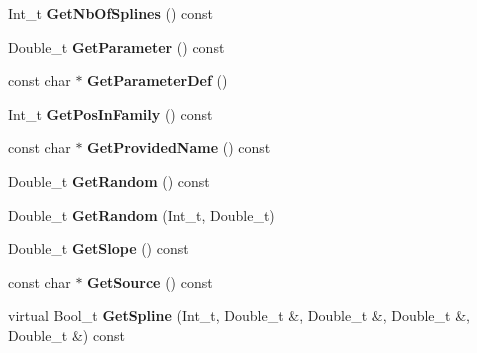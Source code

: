 \begin{DoxyCompactItemize}
\item 
\hypertarget{classTSplineFit_a4f965fd2a14a1d60c898f4e51492aaed}{
Int\_\-t {\bfseries GetNbOfSplines} () const }
\label{classTSplineFit_a4f965fd2a14a1d60c898f4e51492aaed}

\item 
\hypertarget{classTSplineFit_ad75b42637186a1c32ca4c2fd1013ff97}{
Double\_\-t {\bfseries GetParameter} () const }
\label{classTSplineFit_ad75b42637186a1c32ca4c2fd1013ff97}

\item 
\hypertarget{classTSplineFit_a7ba8494513323c4d212e649c0e2cddc5}{
const char $\ast$ {\bfseries GetParameterDef} ()}
\label{classTSplineFit_a7ba8494513323c4d212e649c0e2cddc5}

\item 
\hypertarget{classTSplineFit_aef905799c6e58fd587476a6e225b253a}{
Int\_\-t {\bfseries GetPosInFamily} () const }
\label{classTSplineFit_aef905799c6e58fd587476a6e225b253a}

\item 
\hypertarget{classTSplineFit_a3b7036bfb75e585cd00928e6ad63d305}{
const char $\ast$ {\bfseries GetProvidedName} () const }
\label{classTSplineFit_a3b7036bfb75e585cd00928e6ad63d305}

\item 
\hypertarget{classTSplineFit_a0a2b04890810a740dc8899b1d9a5b47e}{
Double\_\-t {\bfseries GetRandom} () const }
\label{classTSplineFit_a0a2b04890810a740dc8899b1d9a5b47e}

\item 
\hypertarget{classTSplineFit_a4f6786e9b1624c085ff443eef3fdc282}{
Double\_\-t {\bfseries GetRandom} (Int\_\-t, Double\_\-t)}
\label{classTSplineFit_a4f6786e9b1624c085ff443eef3fdc282}

\item 
\hypertarget{classTSplineFit_a58296fcc13b002f272a5ec1410ef73eb}{
Double\_\-t {\bfseries GetSlope} () const }
\label{classTSplineFit_a58296fcc13b002f272a5ec1410ef73eb}

\item 
\hypertarget{classTSplineFit_a853b3d6506a8edc4d10d9aac0aedc072}{
const char $\ast$ {\bfseries GetSource} () const }
\label{classTSplineFit_a853b3d6506a8edc4d10d9aac0aedc072}

\item 
\hypertarget{classTSplineFit_a04f8bf2936490060792eee0b1bcd1af3}{
virtual Bool\_\-t {\bfseries GetSpline} (Int\_\-t, Double\_\-t \&, Double\_\-t \&, Double\_\-t \&, Double\_\-t \&) const }
\label{classTSplineFit_a04f8bf2936490060792eee0b1bcd1af3}


\end{DoxyCompactItemize}
